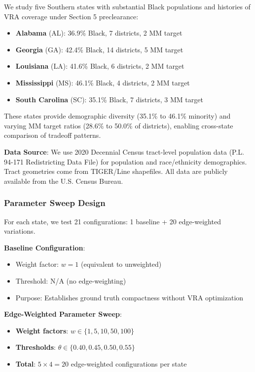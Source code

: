 We study five Southern states with substantial Black populations and histories of VRA coverage under Section 5 preclearance:
\begin{itemize}
    \item \textbf{Alabama} (AL): 36.9\% Black, 7 districts, 2 MM target
    \item \textbf{Georgia} (GA): 42.4\% Black, 14 districts, 5 MM target
    \item \textbf{Louisiana} (LA): 41.6\% Black, 6 districts, 2 MM target
    \item \textbf{Mississippi} (MS): 46.1\% Black, 4 districts, 2 MM target
    \item \textbf{South Carolina} (SC): 35.1\% Black, 7 districts, 3 MM target
\end{itemize}

These states provide demographic diversity (35.1\% to 46.1\% minority) and varying MM target ratios (28.6\% to 50.0\% of districts), enabling cross-state comparison of tradeoff patterns.

\textbf{Data Source}: We use 2020 Decennial Census tract-level population data (P.L. 94-171 Redistricting Data File) for population and race/ethnicity demographics. Tract geometries come from TIGER/Line shapefiles. All data are publicly available from the U.S. Census Bureau.

\subsubsection{Parameter Sweep Design}

For each state, we test 21 configurations: 1 baseline + 20 edge-weighted variations.

\textbf{Baseline Configuration}:
\begin{itemize}
    \item Weight factor: $w = 1$ (equivalent to unweighted)
    \item Threshold: N/A (no edge-weighting)
    \item Purpose: Establishes ground truth compactness without VRA optimization
\end{itemize}

\textbf{Edge-Weighted Parameter Sweep}:
\begin{itemize}
    \item \textbf{Weight factors}: $w \in \{1, 5, 10, 50, 100\}$
    \item \textbf{Thresholds}: $\theta \in \{0.40, 0.45, 0.50, 0.55\}$
    \item \textbf{Total}: $5 \times 4 = 20$ edge-weighted configurations per state
\end{itemize}

